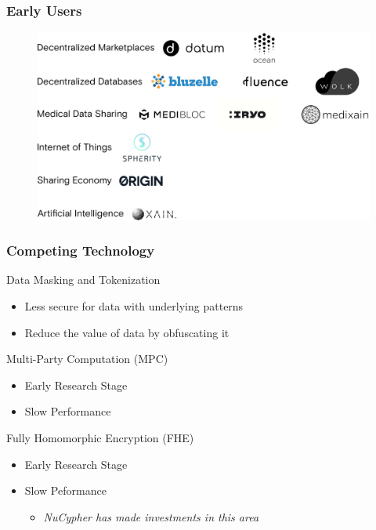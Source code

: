 \documentclass[xetex,mathsans,sans,aspectratio=169]{beamer}
\begin{document}
    \begin{frame}
      \frametitle{Early Users}
      \begin{figure}
           \includegraphics[width=13cm]{pdf/projects.pdf}
      \end{figure}
    \end{frame}

    \begin{frame}
      \frametitle{Competing Technology}
       Data Masking and Tokenization
       \begin{itemize}
           \item Less secure for data with underlying patterns
           \item Reduce the value of data by obfuscating it
       \end{itemize}

       Multi-Party Computation (MPC)
       \begin{itemize}
           \item Early Research Stage
           \item Slow Performance
       \end{itemize}
      
       Fully Homomorphic Encryption (FHE)
       \begin{itemize}
           \item Early Research Stage
           \item Slow Peformance
           \begin{itemize}
               \item \emph{NuCypher has made investments in this area}
           \end{itemize}
       \end{itemize}
       
     \end{frame}
    
\end{document}

